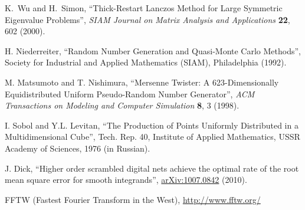 \documentclass[12pt,titlepage]{article}
\begin{document}
\begin{thebibliography}{99}
K.~Wu and H.~Simon, ``Thick-Restart Lanczos Method
for Large Symmetric Eigenvalue Problems'',
{\it SIAM Journal on Matrix Analysis and Applications} {\bf 22}, 602 (2000).

H. Niederreiter, ``Random Number Generation and Quasi-Monte
 Carlo Methods'', Society for Industrial and Applied Mathematics (SIAM),
 Philadelphia (1992).

 M. Matsumoto and T. Nishimura, ``Mersenne Twister:
A 623-Dimensionally Equidistributed Uniform Pseudo-Random Number Generator'',
{\it ACM Transactions on Modeling and Computer Simulation} {\bf 8}, 3 (1998).

 I. Sobol and Y.L. Levitan, 
``The Production of Points Uniformly Distributed in a Multidimensional Cube'',
Tech. Rep. 40, Institute of Applied Mathematics,
USSR Academy of Sciences, 1976 (in Russian).

 J. Dick, ``Higher order scrambled digital nets achieve the optimal rate of the root mean square error for smooth integrands'',
\href{http://arxiv.org/abs/1007.0842}{arXiv:1007.0842} (2010).

FFTW (Fastest Fourier Transform in the West),
\href{http://www.fftw.org/}{http://www.fftw.org/}

\end{thebibliography}

\cleardoublepage
{}
{}
\printindex
\end{document}
